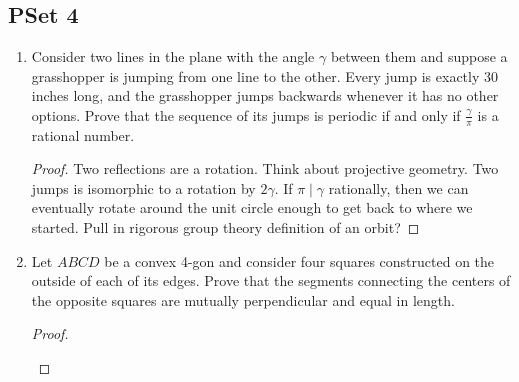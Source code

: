 \documentclass[../apprentice.tex]{subfiles}
\begin{document}
\chapter{}
\section{PSet 4}
\begin{enumerate}
    \item {}Consider two lines in the plane with the angle $\gamma$ between them and suppose a grasshopper is jumping from one line to the other. Every jump is exactly 30 inches long, and the grasshopper jumps backwards whenever it has no other options. Prove that the sequence of its jumps is periodic if and only if $\frac{\gamma}{\pi}$ is a rational number.
    \begin{proof}
        Two reflections are a rotation. Think about projective geometry. Two jumps is isomorphic to a rotation by $2\gamma$. If $\pi\mid\gamma$ rationally, then we can eventually rotate around the unit circle enough to get back to where we started. Pull in rigorous group theory definition of an orbit?
    \end{proof}
    \item Let $ABCD$ be a convex 4-gon and consider four squares constructed on the outside of each of its edges. Prove that the segments connecting the centers of the opposite squares are mutually perpendicular and equal in length.
    \begin{proof}
        \begin{figure}[h!]
            \centering
\end{figure}
\end{proof}
\end{enumerate}
\end{document}
